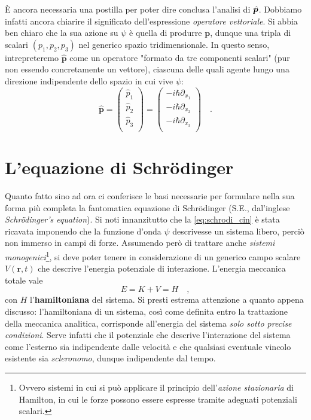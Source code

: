 È ancora necessaria una postilla per poter dire conclusa l'analisi di $\hat{\bm{p}}$. Dobbiamo infatti ancora chiarire il significato dell'espressione \emph{operatore vettoriale}. Si abbia ben chiaro che la sua azione su $\psi$ è quella di produrre $\bm{p}$, dunque una tripla di scalari $(p_1, p_2, p_3)$ nel generico spazio tridimensionale. In questo senso, intrepreteremo $\hat{\bm{p}}$ come un operatore "formato da tre componenti scalari" (pur non essendo concretamente un vettore), ciascuna delle quali agente lungo una direzione indipendente dello spazio in cui vive $\psi$:
\begin{equation}
    \hat{\bm{p}} = 
    \begin{pmatrix}
        \hat{p}_1 \\
        \hat{p}_2 \\
        \hat{p}_3 \\
    \end{pmatrix}
    = 
    \begin{pmatrix}
        -i\hbar \partial_{x_1} \\
        -i\hbar \partial_{x_2} \\
        -i\hbar \partial_{x_3} \\
    \end{pmatrix}
    \quad.
    \label{eq:op_p}
\end{equation}   

\section{L'equazione di Schrödinger}
Quanto fatto sino ad ora ci conferisce le basi necessarie per formulare nella sua forma più completa la fantomatica equazione di Schrödinger (S.E., dal'inglese \emph{Schrödinger's equation}). Si noti innanzitutto che la \eqref{eq:schrodi_cin} è stata ricavata imponendo che la funzione d'onda $\psi$ descrivesse un sistema libero, perciò non immerso in campi di forze. Assumendo però di trattare anche \emph{sistemi monogenici}\footnote{Ovvero sistemi in cui si può applicare il principio dell'\emph{azione stazionaria} di Hamilton, in cui le forze possono essere espresse tramite adeguati potenziali scalari.}, si deve poter tenere in considerazione di un generico campo scalare $V(\bm{r},t)$ che descrive l'energia potenziale di interazione. L'energia meccanica totale vale
\[
    E = K + V = H \quad,
\]
con $H$ l'\textbf{hamiltoniana} del sistema. Si presti estrema attenzione a quanto appena discusso: l'hamiltoniana di un sistema, così come definita entro la trattazione della meccanica analitica, corrisponde all'energia del sistema \emph{solo sotto precise condizioni}. Serve infatti che il potenziale che descrive l'interazione del sistema come l'esterno sia indipendente dalle velocità e che qualsiasi eventuale vincolo esistente sia \emph{scleronomo}, dunque indipendente dal tempo.

